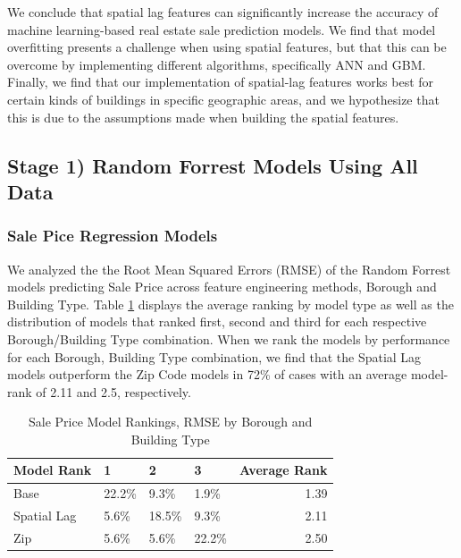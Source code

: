 \documentclass[12pt,]{article}
\begin{document}
We conclude that spatial lag features can significantly increase the
accuracy of machine learning-based real estate sale prediction models.
We find that model overfitting presents a challenge when using spatial
features, but that this can be overcome by implementing different
algorithms, specifically ANN and GBM. Finally, we find that our
implementation of spatial-lag features works best for certain kinds of
buildings in specific geographic areas, and we hypothesize that this is
due to the assumptions made when building the spatial features.

\hypertarget{stage-1-random-forrest-models-using-all-data}{%
\subsection{Stage 1) Random Forrest Models Using All
Data}\label{stage-1-random-forrest-models-using-all-data}}

\hypertarget{sale-pice-regression-models}{%
\subsubsection{Sale Pice Regression
Models}\label{sale-pice-regression-models}}

We analyzed the the Root Mean Squared Errors (RMSE) of the Random
Forrest models predicting Sale Price across feature engineering methods,
Borough and Building Type. Table \ref{tab:SalePriceModelRank} displays
the average ranking by model type as well as the distribution of models
that ranked first, second and third for each respective Borough/Building
Type combination. When we rank the models by performance for each
Borough, Building Type combination, we find that the Spatial Lag models
outperform the Zip Code models in 72\% of cases with an average
model-rank of 2.11 and 2.5, respectively.

\begin{table}

\caption{\label{tab:Sale Price Model Rank Distributions}\label{tab:SalePriceModelRank} Sale Price Model Rankings, RMSE by Borough and Building Type}
\centering
\begin{tabular}[t]{llllr}
\toprule
Model Rank & 1 & 2 & 3 & Average Rank\\
\midrule
Base & 22.2\% & 9.3\% & 1.9\% & 1.39\\
Spatial Lag & 5.6\% & 18.5\% & 9.3\% & 2.11\\
Zip & 5.6\% & 5.6\% & 22.2\% & 2.50\\
\bottomrule
\end{tabular}
\end{table}
\end{document}
